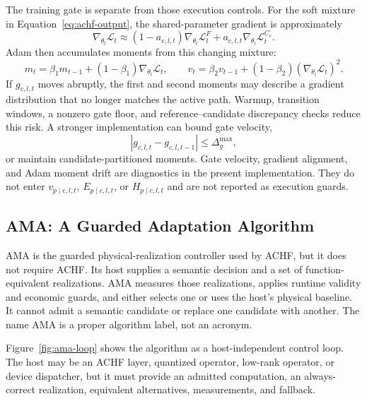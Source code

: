 \documentclass{article}
\newcommand{\achf}{\textsc{ACHF}}
\newcommand{\ama}{\textsc{AMA}}
\begin{document}
The training gate is separate from those execution controls. For the soft
mixture in Equation~\eqref{eq:achf-output}, the shared-parameter gradient is
approximately
\begin{equation}
\nabla_{\theta_l}\mathcal{L}_t
\approx
(1-a_{c,l,t})\nabla_{\theta_l}\mathcal{L}^{F}_t
+a_{c,l,t}\nabla_{\theta_l}\mathcal{L}^{C_c}_t .
\label{eq:achf-gradient-mixture}
\end{equation}
Adam \cite{kingma2015adam} then accumulates moments from this changing mixture:
\begin{equation}
m_t=\beta_1m_{t-1}+(1-\beta_1)\nabla_{\theta_l}\mathcal{L}_t,
\qquad
v_t=\beta_2v_{t-1}+(1-\beta_2)(\nabla_{\theta_l}\mathcal{L}_t)^2 .
\label{eq:achf-adam-moments}
\end{equation}
If $g_{c,l,t}$ moves abruptly, the first and second moments may describe a
gradient distribution that no longer matches the active path. Warmup,
transition windows, a nonzero gate floor, and reference--candidate discrepancy
checks reduce this risk. A stronger implementation can bound gate velocity,
\begin{equation}
|g_{c,l,t}-g_{c,l,t-1}|\le \Delta_g^{\max},
\label{eq:achf-gate-velocity}
\end{equation}
or maintain candidate-partitioned moments. Gate velocity, gradient alignment,
and Adam moment drift are diagnostics in the present implementation. They do
not enter $v_{p\mid c,l,t}$, $E_{p\mid c,l,t}$, or $H_{p\mid c,l,t}$ and are
not reported as execution guards.

\subsection{\ama{}: A Guarded Adaptation Algorithm}

\ama{} is the guarded physical-realization controller used by ACHF, but it does
not require ACHF. Its host supplies a semantic decision and a set of
function-equivalent realizations. \ama{} measures those realizations, applies
runtime validity and economic guards, and either selects one or uses the host's
physical baseline. It cannot admit a semantic candidate or replace one
candidate with another. The name \ama{} is a proper algorithm label, not an
acronym.

Figure~\ref{fig:ama-loop} shows the algorithm as a host-independent control
loop. The host may be an \achf{} layer, quantized operator, low-rank operator,
or device dispatcher, but it must provide an admitted computation, an
always-correct realization, equivalent alternatives, measurements, and fallback.
\end{document}
